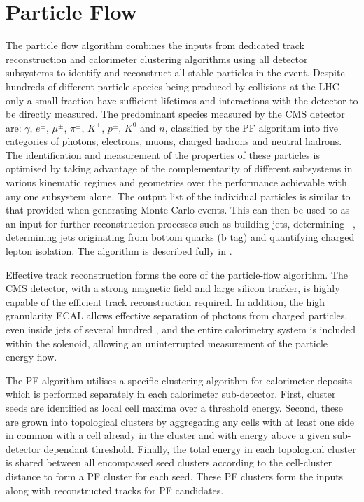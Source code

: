 \section{Particle Flow}

The particle flow algorithm combines the inputs from dedicated track reconstruction and calorimeter clustering
algorithms using all detector subsystems to identify and reconstruct all stable particles in the event.
Despite hundreds of different particle species being produced by collisions at the LHC only a small fraction
have sufficient lifetimes and interactions with the detector to be directly measured. The predominant species
measured by the CMS detector are: $\gamma$, $e^{\pm}$, $\mu^{\pm}$, $\pi^{\pm}$, $K^{\pm}$, $p^{\pm}$, $K^{0}$
and $n$, classified by the PF algorithm into five categories of photons, electrons, muons, charged hadrons and neutral hadrons. 
The identification and measurement of the properties of these particles is optimised by taking advantage of the complementarity of 
different subsystems in various kinematic regimes and geometries over the performance achievable with 
any one subsystem alone. The output list of the individual particles is similar to that provided
when generating Monte Carlo events. This can then be used to as an input for further reconstruction processes
such as building jets, determining  \met~, determining jets originating from bottom quarks (b tag) and quantifying
charged lepton isolation. The algorithm is described fully in \cite{pf_proc,pf_pas}.

Effective track reconstruction forms the core of the particle-flow algorithm. The CMS detector, with a strong magnetic field
and large silicon tracker, is highly capable of the efficient track reconstruction required. In addition, the high 
granularity ECAL allows effective separation of photons from charged particles, even inside jets of several hundred
\GeV, and the entire calorimetry system is included within the solenoid, allowing an uninterrupted measurement 
of the particle energy flow.

The PF algorithm utilises a specific clustering algorithm for calorimeter deposits which is performed separately 
in each calorimeter sub-detector. First, cluster seeds are identified as local cell maxima over a threshold energy.
Second, these are grown into topological clusters by aggregating any cells with at least one side in common with
a cell already in the cluster and with energy above a given sub-detector dependant threshold. Finally, the 
total energy in each topological cluster is shared between all encompassed seed clusters according to the 
cell-cluster distance to form a PF cluster for each seed. These PF clusters form the inputs along with 
reconstructed tracks for PF candidates.

